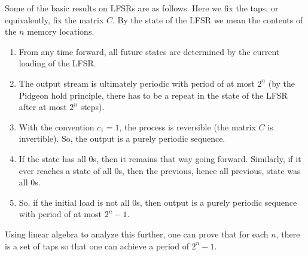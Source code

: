 \documentclass[12pt]{amsart}
\theoremstyle{plain}
\theoremstyle{definition}
\theoremstyle{remark}
\begin{document}
Some of the basic results on LFSRs are as follows.  Here we fix the
taps, or equivalently, fix the matrix $C$.  By the state of the LFSR
we mean the contents of the $n$ memory locations.
\begin{enumerate}
  \item From any time forward, all future states are determined by the
    current loading of the LFSR.
  \item The output stream is ultimately periodic with period of at
    most $2^n$ (by the Pidgeon hold principle, there has to be a
    repeat in the state of the LFSR after at most $2^n$ steps).
  \item With the convention $c_1=1$, the process is reversible (the
    matrix $C$ is invertible).  So, the output is a purely periodic
    sequence.
  \item If the state has all $0$s, then it remains that way going
    forward.  Similarly, if it ever reaches a state of all $0$s, then
    the previous, hence all previous, state was all $0$s.
  \item So, if the initial load is not all $0$s, then output is a
    purely periodic sequence with period of at most $2^n-1$.
\end{enumerate}
Using linear algebra to analyze this further, one can prove that for
each $n$, there is a set of taps so that one can achieve a period of $2^n-1$.
\end{document}
